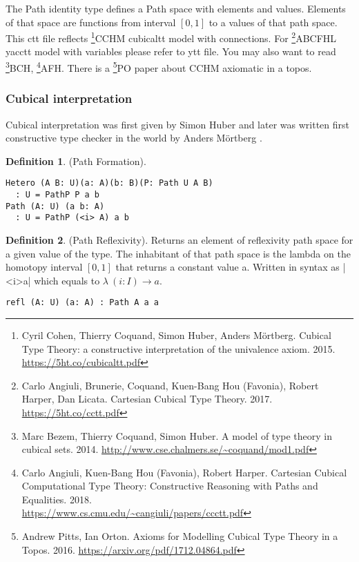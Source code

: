 \documentclass{article}
\theoremstyle{definition}
\newtheorem{definition}{Definition}
\begin{document}
The Path identity type defines a Path space with elements and values.
Elements of that space are functions from interval $[0,1]$ to a values of that path space.
This ctt file reflects \footnote{Cyril Cohen, Thierry Coquand, Simon Huber, Anders M{\"{o}}rtberg. Cubical Type Theory: a constructive interpretation of the univalence axiom. 2015. \url{https://5ht.co/cubicaltt.pdf}}{CCHM} cubicaltt model with connections.
For \footnote{Carlo Angiuli, Brunerie, Coquand, Kuen-Bang Hou (Favonia), Robert Harper, Dan Licata. Cartesian Cubical Type Theory. 2017. \url{https://5ht.co/cctt.pdf}}{ABCFHL} yacctt model with
variables please refer to ytt file. You may also want to
read \footnote{Marc Bezem, Thierry Coquand, Simon Huber. A model of type theory in cubical sets. 2014. \url{http://www.cse.chalmers.se/~coquand/mod1.pdf}}{BCH},
\footnote{Carlo Angiuli, Kuen-Bang Hou (Favonia), Robert Harper. Cartesian Cubical Computational Type Theory: Constructive Reasoning with Paths and Equalities. 2018. \\ \url{https://www.cs.cmu.edu/~cangiuli/papers/ccctt.pdf}}{AFH}.
There is a \footnote{Andrew Pitts, Ian Orton. Axioms for Modelling Cubical Type Theory in a Topos. 2016. \url{https://arxiv.org/pdf/1712.04864.pdf}}{PO} paper about CCHM axiomatic in a topos.

\subsubsection*{Cubical interpretation}

Cubical interpretation was first given by Simon Huber \cite{Huber16} and later was
written first constructive type checker in the world by Anders M{\"{o}}rtberg \cite{Mortberg17}.

\begin{definition} (Path Formation).
\begin{lstlisting}
Hetero (A B: U)(a: A)(b: B)(P: Path U A B)
  : U = PathP P a b
Path (A: U) (a b: A)
  : U = PathP (<i> A) a b
\end{lstlisting}
\end{definition}

\begin{definition} (Path Reflexivity).
Returns an element of reflexivity path space for a given value of the type.
The inhabitant of that path space is the lambda on the homotopy
interval $[0,1]$ that returns a constant value a. Written in
syntax as |<i>a| which equals to $\lambda\ (i: I) \rightarrow a$.
\begin{lstlisting}
refl (A: U) (a: A) : Path A a a
\end{lstlisting}
\end{definition}
\end{document}
